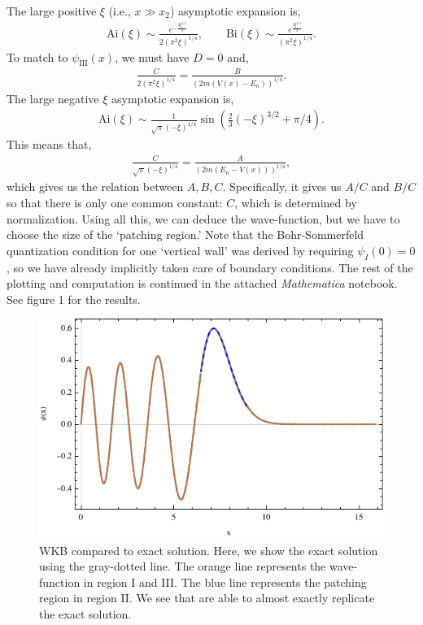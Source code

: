 \documentclass[10pt]{article}
\newcommand{\1}{\mathbf 1}
\begin{document}
The large positive $\xi$ (i.e., $x \gg x_2$) asymptotic expansion is,
\begin{align}
	\mathrm{Ai}(\xi)
	\sim
	\frac{e^{-\frac{2 \xi ^{3/2}}{3}}}{2 (\pi^2 \xi)^{1/4}},
	\qquad
	\mathrm{Bi}(\xi)
	\sim
	\frac{e^{\frac{2 \xi ^{3/2}}{3}}}{(\pi^2\xi)^{1/4}}.
\end{align}
To match to $\psi_{\mathrm{III}}(x)$, we must have $D = 0$ and,
\begin{align}
	\frac{C}{2(\pi^2 \xi)^{1/4}}
	=
	\frac{B}{(2m(V(x)- E_n))^{1/4}}.
\end{align}
The large negative $\xi$ asymptotic expansion is,
\begin{align}
	\mathrm{Ai}(\xi)
	\sim 
	\frac{1}{\sqrt{\pi}(-\xi)^{1/4}}
	\sin(\frac{2}{3}(-\xi)^{3/2} + \pi/4).
\end{align}
This means that,
\begin{align}
	\frac{C}{\sqrt{\pi}(-\xi)^{1/4}}
	=
	\frac{A}{(2m(E_n - V(x)))^{1/4}},
\end{align}
which gives us the relation between $A,B,C$.
Specifically, it gives us $A/C$ and $B/C$ so that there is only one common constant: $C$, which is determined by normalization.
Using all this, we can deduce the wave-function, but we have to choose the size of the `patching region.'
Note that the Bohr-Sommerfeld quantization condition for one `vertical wall' was derived by requiring $\psi_I(0) = 0$, so we have already implicitly taken care of boundary conditions.
The rest of the plotting and computation is continued in the attached {\em Mathematica} notebook.
See figure 1 for the results.
\begin{figure}[h!]
	\centering
	\includegraphics[width=0.8\linewidth]{plot.pdf}
	\caption{
		WKB compared to exact solution.
		Here, we show the exact solution using the gray-dotted line.
		The orange line represents the wave-function in region I and III.
		The blue line represents the patching region in region II.
		We see that are able to almost exactly replicate the exact solution.
	}
\end{figure}
\end{document}
